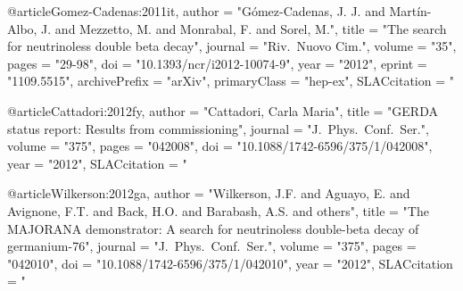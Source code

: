 {{@article{Gomez-Cadenas:2011it,
      author         = "G\'omez-Cadenas, J. J. and Mart\'in-Albo, J. and Mezzetto, M.
                        and Monrabal, F. and Sorel, M.",
      title          = "{The search for neutrinoless double beta decay}",
      journal        = "Riv.\ Nuovo Cim.",
      volume         = "35",
      pages          = "29-98",
      doi            = "10.1393/ncr/i2012-10074-9",
      year           = "2012",
      eprint         = "1109.5515",
      archivePrefix  = "arXiv",
      primaryClass   = "hep-ex",
      SLACcitation   = "%
}

@article{Cattadori:2012fy,
      author         = "Cattadori, Carla Maria",
      title          = "{GERDA status report: Results from commissioning}",
      journal        = "J.\ Phys.\ Conf.\ Ser.",
      volume         = "375",
      pages          = "042008",
      doi            = "10.1088/1742-6596/375/1/042008",
      year           = "2012",
      SLACcitation   = "%
}

@article{Wilkerson:2012ga,
      author         = "Wilkerson, J.F. and Aguayo, E. and Avignone, F.T. and
                        Back, H.O. and Barabash, A.S. and others",
      title          = "{The MAJORANA demonstrator: A search for neutrinoless
                        double-beta decay of germanium-76}",
      journal        = "J.\ Phys.\ Conf.\ Ser.",
      volume         = "375",
      pages          = "042010",
      doi            = "10.1088/1742-6596/375/1/042010",
      year           = "2012",
      SLACcitation   = "%
}

}}
